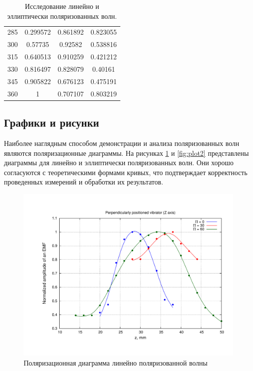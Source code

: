 \documentclass[11pt,a4paper,oneside, reqno]{amsproc}
\begin{document}
\begin{centering}
\begin{table}[h!]
\begin{tabular}{cccc}
285 & 0.299572 & 0.861892 & 0.823055\\
300 & 0.57735 & 0.92582 & 0.538816\\
315 & 0.640513 & 0.910259 & 0.421212\\
330 & 0.816497 & 0.828079 & 0.40161\\
345 & 0.905822 & 0.676123 & 0.475191\\
360 & 1 & 0.707107 & 0.803219\\
\bottomrule
\end{tabular}
\vspace{5 pt}
\caption{Исследование линейно и эллиптически поляризованных волн.} 
\label{tab:tab1}
\end{table}
\end{centering}

\subsection{Графики и рисунки}
Наиболее наглядным способом демонстрации и анализа поляризованных волн являются
поляризационные диаграммы. На рисунках \ref{fig:plot1} и \ref{fig:plot2}
представлены диаграммы для линейно и эллиптически поляризованных волн.
Они хорошо согласуются с теоретическими формами кривых, что
подтверждает корректность проведенных измерений и обработки их результатов.\\

\begin{figure}[hb!]
    \begin{center}
        \includegraphics[width=\textwidth]{plot1.pdf}
    \end{center}
    \caption{Поляризационная диаграмма линейно поляризованной волны}
    \label{fig:plot1}
\end{figure}
\end{document}
